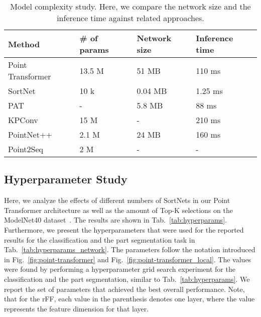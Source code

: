\documentclass{ieeeaccess}
\begin{document}
\begin{table}[t!]
\centering
\caption {Model complexity study. Here, we compare the network size and the inference time against related approaches.} \label{tab:model_size} 
\begin{tabular}{@{}llll@{}}
\toprule
Method            & \# of params & Network size & Inference time \\ \midrule
Point Transformer & 13.5 M & 51 MB        & 110 ms   \\
SortNet           & 10 k         &   0.04 MB           & 1.25 ms    \\ \midrule
PAT~\cite{yang2019modeling} & - & 5.8 MB & 88 ms \\ 
KPConv~\cite{thomas2019kpconv}           & 15 M   & -            & 210 ms   \\
PointNet++~\cite{qi2017pointnet++}        & 2.1 M        & 24 MB        & 160 ms   \\
Point2Seq~\cite{liu2019point2sequence}         & 2 M          & -            & -              \\ \bottomrule
\end{tabular}
\end{table}



\subsection{Hyperparameter Study}
Here, we analyze the effects of different numbers of SortNets in our Point Transformer architecture as well as the amount of Top-K selections on the ModelNet40 dataset~\cite{wu20153d}. The results are shown in Tab.~\ref{tab:hyperparams}. Furthermore, we present the hyperparameters that were used for the reported results for the classification and the part segmentation task in Tab.~\ref{tab:hyperparams_network}. The parameters follow the notation introduced in Fig.~\ref{fig:point-transformer} and Fig.~\ref{fig:point-transformer_local}. The values were found by performing a hyperparameter grid search experiment for the classification and the part segmentation, similar to Tab.~\ref{tab:hyperparams}. We report the set of parameters that achieved the best overall performance. Note, that for the rFF, each value in the parenthesis denotes one layer, where the value represents the feature dimension for that layer.
\end{document}
